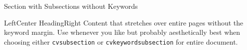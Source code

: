 \documentclass[a4paper]{mcdowellcv}
\begin{document}
    \begin{cvsection}{Section with Subsections without Keywords}
        \begin{cvsubsection}{Left}{Center Heading}{Right}
            Content that stretches over entire pages without the keyword margin. Use whenever you like but probably aesthetically best when choosing either \texttt{cvsubsection} or \texttt{cvkeywordsubsection} for entire document.
            
        \end{cvsubsection}
                   
    \end{cvsection}

\addSignature
\end{document}
